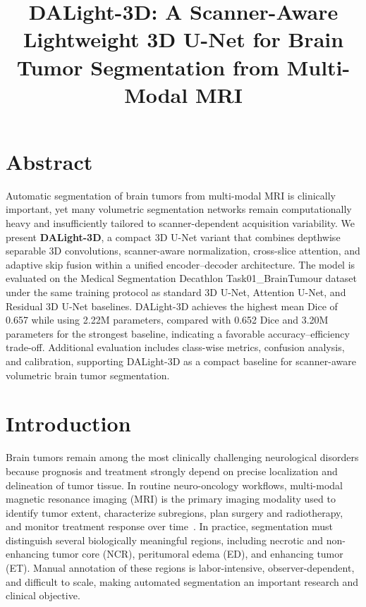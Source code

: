 \documentclass[conference]{IEEEtran}
\title{DALight-3D: A Scanner-Aware Lightweight 3D U-Net for Brain Tumor Segmentation from Multi-Modal MRI}
\author{
\IEEEauthorblockN{Your Name}
\IEEEauthorblockA{
Institution Name \\
City, Country \\
email@domain}
}
\begin{document}
\maketitle
\section{Abstract}

Automatic segmentation of brain tumors from multi-modal MRI is clinically important, yet many volumetric segmentation networks remain computationally heavy and insufficiently tailored to scanner-dependent acquisition variability. We present \textbf{DALight-3D}, a compact 3D U-Net variant that combines depthwise separable 3D convolutions, scanner-aware normalization, cross-slice attention, and adaptive skip fusion within a unified encoder--decoder architecture. The model is evaluated on the Medical Segmentation Decathlon Task01\_BrainTumour dataset under the same training protocol as standard 3D U-Net, Attention U-Net, and Residual 3D U-Net baselines. DALight-3D achieves the highest mean Dice of 0.657 while using 2.22M parameters, compared with 0.652 Dice and 3.20M parameters for the strongest baseline, indicating a favorable accuracy--efficiency trade-off. Additional evaluation includes class-wise metrics, confusion analysis, and calibration, supporting DALight-3D as a compact baseline for scanner-aware volumetric brain tumor segmentation.

\section{Introduction}
\label{sec:intro}

Brain tumors remain among the most clinically challenging neurological disorders because prognosis and treatment strongly depend on precise localization and delineation of tumor tissue. In routine neuro-oncology workflows, multi-modal magnetic resonance imaging (MRI) is the primary imaging modality used to identify tumor extent, characterize subregions, plan surgery and radiotherapy, and monitor treatment response over time~\cite{menze2015brats}. In practice, segmentation must distinguish several biologically meaningful regions, including necrotic and non-enhancing tumor core (NCR), peritumoral edema (ED), and enhancing tumor (ET). Manual annotation of these regions is labor-intensive, observer-dependent, and difficult to scale, making automated segmentation an important research and clinical objective.
\end{document}
